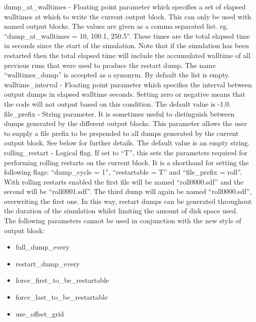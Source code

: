 {\emphtext dump\_at\_walltimes} - Floating point parameter which specifies a
  set of elapsed walltimes at which to write the current output block. This
  can only be used with named output blocks. The values are given as a
  comma separated list. eg. ``dump\_at\_walltimes = 10, 100.1, 250.5''.
  These times are the total elapsed time in seconds since the start of the
  simulation. Note that if the
  simulation has been restarted then the total elapsed time will
  include the accumulated walltime of all previous runs that were
  used to produce the restart dump.
  The name ``walltimes\_dump'' is accepted as a synonym. By default
  the list is empty.\\

{\emphtext walltime\_interval} - Floating point parameter which specifies the
  interval between output dumps in elapsed walltime seconds. Setting zero or
  negative means that the code will not output based on this condition.
  The default value is -1.0.\\

{\emphtext file\_prefix} - String parameter. It is sometimes useful to
  distinguish between dumps generated by the different output blocks. This
  parameter allows the user to supply a file prefix to be prepended to all
  dumps generated by the current output block. See below for further details.
  The default value is an empty string.\\

{\emphtext rolling\_restart} - Logical flag. If set to ``T'', this sets the
  parameters required for performing rolling restarts on the current block.
  It is a shorthand for setting the following flags: ``dump\_cycle = 1'',
  ``restartable = T'' and ``file\_prefix = roll''.
  With rolling restarts enabled the first file will be named ``roll0000.sdf''
  and the second will be ``roll0001.sdf''. The third dump will again be
  named ``roll0000.sdf'', overwriting the first one. In this way, restart
  dumps can be generated throughout the duration of the simulation whilst
  limiting the amount of disk space used.\\

The following parameters cannot be used in conjunction with the new style
of output block:

\begin{itemize}
\item full\_dump\_every
\item restart\_dump\_every
\item force\_first\_to\_be\_restartable
\item force\_last\_to\_be\_restartable
\item use\_offset\_grid
\end{itemize}

